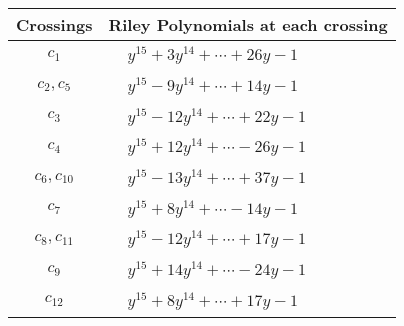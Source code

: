 \documentclass[1p]{elsarticle_modified}
\theoremstyle{definition}
\begin{document}
\begin{tabular}{m{50pt}|m{274pt}}
Crossings & \hspace{64pt}Riley Polynomials at each crossing \\
\hline $$\begin{aligned}c_{1}\end{aligned}$$&$\begin{aligned}
&y^{15}+3 y^{14}+\cdots+26 y-1
\end{aligned}$\\
\hline $$\begin{aligned}c_{2},c_{5}\end{aligned}$$&$\begin{aligned}
&y^{15}-9 y^{14}+\cdots+14 y-1
\end{aligned}$\\
\hline $$\begin{aligned}c_{3}\end{aligned}$$&$\begin{aligned}
&y^{15}-12 y^{14}+\cdots+22 y-1
\end{aligned}$\\
\hline $$\begin{aligned}c_{4}\end{aligned}$$&$\begin{aligned}
&y^{15}+12 y^{14}+\cdots-26 y-1
\end{aligned}$\\
\hline $$\begin{aligned}c_{6},c_{10}\end{aligned}$$&$\begin{aligned}
&y^{15}-13 y^{14}+\cdots+37 y-1
\end{aligned}$\\
\hline $$\begin{aligned}c_{7}\end{aligned}$$&$\begin{aligned}
&y^{15}+8 y^{14}+\cdots-14 y-1
\end{aligned}$\\
\hline $$\begin{aligned}c_{8},c_{11}\end{aligned}$$&$\begin{aligned}
&y^{15}-12 y^{14}+\cdots+17 y-1
\end{aligned}$\\
\hline $$\begin{aligned}c_{9}\end{aligned}$$&$\begin{aligned}
&y^{15}+14 y^{14}+\cdots-24 y-1
\end{aligned}$\\
\hline $$\begin{aligned}c_{12}\end{aligned}$$&$\begin{aligned}
&y^{15}+8 y^{14}+\cdots+17 y-1
\end{aligned}$\\
\hline
\end{tabular}\\~\\
\end{document}

